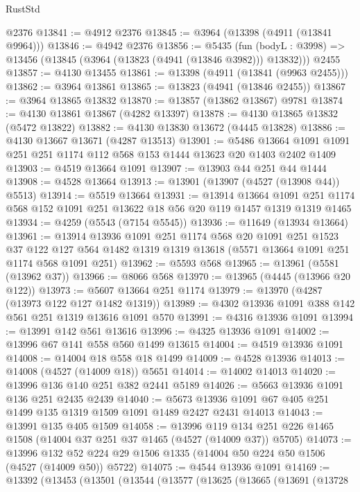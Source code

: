 \begin{lexlean}{RustStd}
\begin{coremodule}
{\begin{coremodule}
{{{{{{{{{{{{{{{{{{{{{{{{{{{{{{{{{{{{{{    @2376
@13841 := @4912 @2376
@13845 := @3964 (@13398 (@4911 (@13841 @9964)))
@13846 := @4942 @2376
@13856 := @5435
    (fun (bodyL : @3998) => @13456 (@13845 (@3964 (@13823 (@4941 (@13846 @3982))) @13832)))
    @2455
@13857 := @4130 @13455
@13861 := @13398 (@4911 (@13841 (@9963 @2455)))
@13862 := @3964 @13861
@13865 := @13823 (@4941 (@13846 @2455))
@13867 := @3964 @13865 @13832
@13870 := @13857 (@13862 @13867) @9781
@13874 := @4130 @13861 @13867 (@4282 @13397)
@13878 := @4130 @13865 @13832 (@5472 @13822)
@13882 := @4130 @13830 @13672 (@4445 @13828)
@13886 := @4130 @13667 @13671 (@4287 @13513)
@13901 := @5486 @13664 @1091 @1091 @251 @251 @1174 @112 @568 @153 @1444 @13623 @20 @1403 @2402 @1409
@13903 := @4519 @13664 @1091
@13907 := @13903 @44 @251 @44 @1444
@13908 := @4528 @13664
@13913 := @13901 (@13907 (@4527 (@13908 @44)) @5513)
@13914 := @5519 @13664
@13931 := @13914
    @13664
    @1091
    @251
    @1174
    @568
    @152
    @1091
    @251
    @13622
    @18
    @56
    @20
    @119
    @1457
    @1319
    @1319
    @1465
@13934 := @4259 (@5543 (@7154 @5545))
@13936 := @11649 (@13934 @13664)
@13961 := @13914
    @13936
    @1091
    @251
    @1174
    @568
    @20
    @1091
    @251
    @1523
    @37
    @122
    @127
    @564
    @1482
    @1319
    @1319
    @13618
    (@5571 @13664 @1091 @251 @1174 @568 @1091 @251)
@13962 := @5593 @568
@13965 := @13961 (@5581 (@13962 @37))
@13966 := @8066 @568
@13970 := @13965 (@4445 (@13966 @20 @122))
@13973 := @5607 @13664 @251 @1174
@13979 := @13970 (@4287 (@13973 @122 @127 @1482 @1319))
@13989 := @4302 @13936 @1091 @388 @142 @561 @251 @1319 @13616 @1091 @570
@13991 := @4316 @13936 @1091
@13994 := @13991 @142 @561 @13616
@13996 := @4325 @13936 @1091
@14002 := @13996 @67 @141 @558 @560 @1499 @13615
@14004 := @4519 @13936 @1091
@14008 := @14004 @18 @558 @18 @1499
@14009 := @4528 @13936
@14013 := @14008 (@4527 (@14009 @18)) @5651
@14014 := @14002 @14013
@14020 := @13996 @136 @140 @251 @382 @2441 @5189
@14026 := @5663 @13936 @1091 @136 @251 @2435 @2439
@14040 := @5673 @13936 @1091 @67 @405 @251 @1499 @135 @1319 @1509 @1091 @1489 @2427 @2431 @14013
@14043 := @13991 @135 @405 @1509
@14058 := @13996
    @119
    @134
    @251
    @226
    @1465
    @1508
    (@14004 @37 @251 @37 @1465 (@4527 (@14009 @37)) @5705)
@14073 := @13996
    @132
    @52
    @224
    @29
    @1506
    @1335
    (@14004 @50 @224 @50 @1506 (@4527 (@14009 @50)) @5722)
@14075 := @4544 @13936 @1091
@14169 := @13392
    (@13453
      (@13501
        (@13544
          (@13577
            (@13625
              (@13665
                (@13691
                  (@13728
}}}}}}}}}}}}}}}}}}}}}}}}}}}}}}}}}}}}}}
\end{coremodule}}
\end{coremodule}
\end{lexlean}
